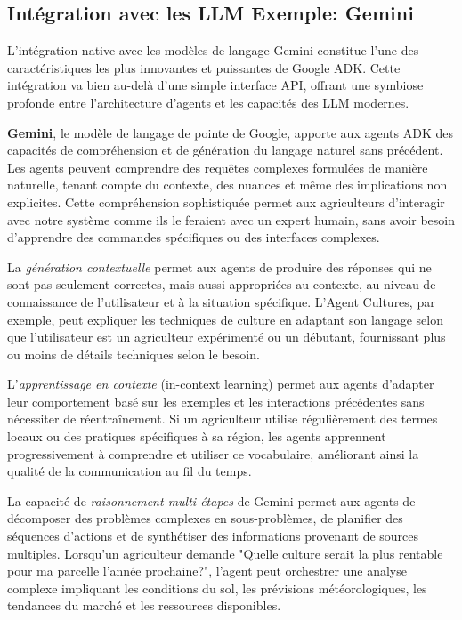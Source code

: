 \subsection{Intégration avec les LLM \textbf{Exemple:} Gemini}

L'intégration native avec les modèles de langage Gemini constitue l'une des caractéristiques les plus innovantes et puissantes de Google ADK. Cette intégration va bien au-delà d'une simple interface API, offrant une symbiose profonde entre l'architecture d'agents et les capacités des LLM modernes.

\textbf{Gemini}, le modèle de langage de pointe de Google, apporte aux agents ADK des capacités de compréhension et de génération du langage naturel sans précédent. Les agents peuvent comprendre des requêtes complexes formulées de manière naturelle, tenant compte du contexte, des nuances et même des implications non explicites. Cette compréhension sophistiquée permet aux agriculteurs d'interagir avec notre système comme ils le feraient avec un expert humain, sans avoir besoin d'apprendre des commandes spécifiques ou des interfaces complexes.

La \emph{génération contextuelle} permet aux agents de produire des réponses qui ne sont pas seulement correctes, mais aussi appropriées au contexte, au niveau de connaissance de l'utilisateur et à la situation spécifique. L'Agent Cultures, par exemple, peut expliquer les techniques de culture en adaptant son langage selon que l'utilisateur est un agriculteur expérimenté ou un débutant, fournissant plus ou moins de détails techniques selon le besoin.

L'\emph{apprentissage en contexte} (in-context learning) permet aux agents d'adapter leur comportement basé sur les exemples et les interactions précédentes sans nécessiter de réentraînement. Si un agriculteur utilise régulièrement des termes locaux ou des pratiques spécifiques à sa région, les agents apprennent progressivement à comprendre et utiliser ce vocabulaire, améliorant ainsi la qualité de la communication au fil du temps.

La capacité de \emph{raisonnement multi-étapes} de Gemini permet aux agents de décomposer des problèmes complexes en sous-problèmes, de planifier des séquences d'actions et de synthétiser des informations provenant de sources multiples. Lorsqu'un agriculteur demande "Quelle culture serait la plus rentable pour ma parcelle l'année prochaine?", l'agent peut orchestrer une analyse complexe impliquant les conditions du sol, les prévisions météorologiques, les tendances du marché et les ressources disponibles.

